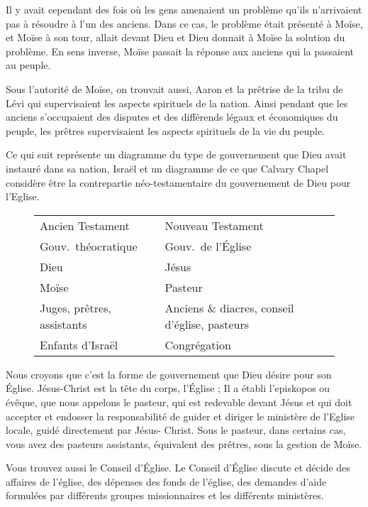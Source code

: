 Il y avait cependant des fois où les gens amenaient un problème qu’ils n’arrivaient pas à résoudre à l’un des anciens.
Dans ce cas, le problème était présenté à Moïse, et Moïse à son tour, allait devant Dieu et Dieu donnait à Moïse la
solution du problème. En sens inverse, Moïse passait la réponse aux anciens qui la passaient au peuple.

Sous l’autorité de Moïse, on trouvait aussi, Aaron et la prêtrise de la tribu de Lévi qui supervisaient les aspects
spirituels de la nation. Ainsi pendant que les anciens s’occupaient des disputes et des différends légaux et
économiques du peuple, les prêtres supervisaient les aspects spirituels de la vie du peuple.

Ce qui suit représente un diagramme du type de gouvernement que Dieu avait instauré dans sa nation, Israël et un
diagramme de ce que Calvary Chapel considère être la contrepartie néo-testamentaire du gouvernement de Dieu pour
l’Eglise.

\begin{figure}[h!]
\begin{tabular}{p{}|p{}}
Ancien Testament & Nouveau Testament\\
Gouv.\ théocratique & Gouv.\ de l’Église\\
\hline
\hline
Dieu & Jésus\\
\hline
Moïse & Pasteur\\
\hline
Juges, prêtres, assistants & Anciens \& diacres, conseil d’église, pasteurs\\
\hline
Enfants d’Israël & Congrégation\\
\end{tabular}
\end{figure}

Nous croyons que c’est la forme de gouvernement que Dieu désire pour son Église. Jésus-Christ est la tête du corps,
l’Église ; Il a établi l’episkopos ou évêque, que nous appelons le pasteur, qui est redevable devant Jésus et qui doit
accepter et endosser la responsabilité de guider et diriger le ministère de l’Eglise locale, guidé directement par Jésus-
Christ. Sous le pasteur, dans certains cas, vous avez des pasteurs assistants, équivalent des prêtres, sous la gestion
de Moïse.

Vous trouvez aussi le Conseil d’Église. Le Conseil d’Église discute et décide des affaires de l’église, des dépenses des
fonds de l’église, des demandes d’aide formulées par différents groupes missionnaires et les différents ministères.

